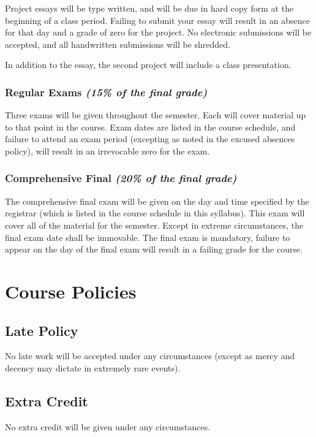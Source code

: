 \documentclass[11pt]{article}
\begin{document}
Project essays will be type written, and will be due in hard copy form
at the beginning of a class period. Failing to submit your essay will
result in an absence for that day and a grade of zero for the project. No electronic submissions will be
accepted, and all handwritten submissions will be shredded.

In addition to the essay, the second project will include a class presentation.

\subsubsection*{Regular Exams {\em (15\% of the final grade)}}
Three exams will be given
throughout the semester. Each will cover material up to that point in
the course. Exam dates are listed in the course schedule, and failure to
attend an exam period (excepting as noted in the excused absences
policy), will result in an irrevocable zero for the exam.

\subsubsection*{Comprehensive Final {\em (20\% of the final grade)}} 
The comprehensive
final exam will be given on the day and time specified by the
registrar (which is listed in the course schedule in this syllabus). This exam will cover all of the material for the semester.
Except in extreme circumstances, the final exam date shall be
immovable. The final exam is mandatory, failure to appear on the day of the final
exam will result in a failing grade for the course.


\newpage
\section*{Course Policies}

\subsection*{Late Policy}
No late work will be accepted under any circumstances (except as mercy
and decency may dictate in extremely rare events).

\subsection*{Extra Credit}
No extra credit will be given under any circumstances.
\end{document}
